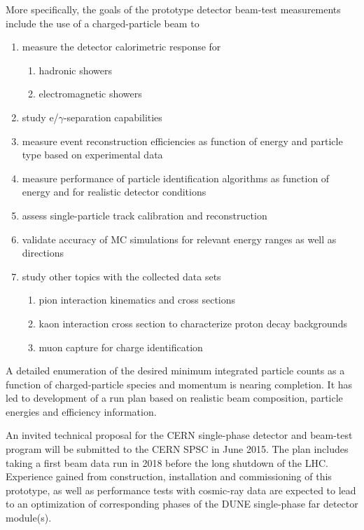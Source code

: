 More specifically, the goals of the prototype detector beam-test measurements include
the use of a charged-particle beam to
\begin{enumerate}
\item measure the detector calorimetric response for
\begin{enumerate}
	\item hadronic showers
	\item electromagnetic showers
\end{enumerate}
\item study e/$\gamma$-separation capabilities
\item measure event reconstruction efficiencies as function of energy and particle type based on experimental data
\item measure performance of particle identification algorithms as function of energy and for realistic detector conditions
\item assess single-particle track calibration and reconstruction
\item validate accuracy of MC simulations for relevant energy ranges as well as directions 

\item study other topics with the collected data sets
 \begin{enumerate}
    \item pion interaction kinematics and cross sections
    \item kaon interaction cross section to characterize proton decay backgrounds
    \item muon capture for charge identification
 \end{enumerate}
\end{enumerate}

A detailed %
enumeration of the desired minimum integrated particle counts as a function
of charged-particle species and momentum is nearing completion. %
It has led to development of a run plan based on realistic beam composition, particle energies and efficiency information. 

An invited technical proposal for the CERN single-phase detector and beam-test program
\cite{CERN_single-phase_proposal} will be submitted to the CERN SPSC in June 2015. The plan
includes %
taking a first beam data run in 2018 before the long shutdown of the LHC. Experience gained from construction, installation and commissioning of this prototype, as well as performance tests with
cosmic-ray data are expected to lead to an optimization of corresponding phases of the DUNE 
single-phase far detector module(s).

